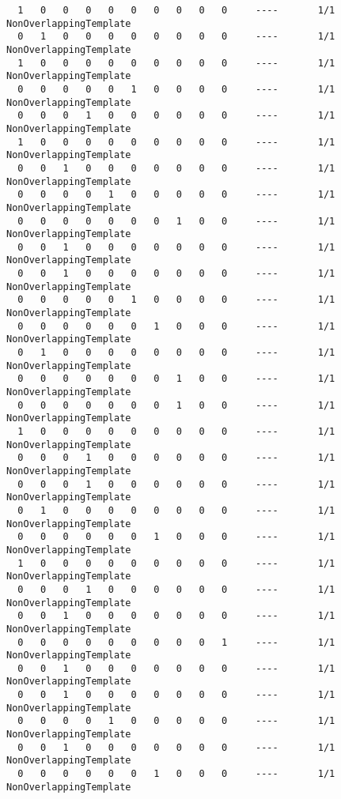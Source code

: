 \begin{code}
\begin{verbatim}
  1   0   0   0   0   0   0   0   0   0     ----       1/1       NonOverlappingTemplate
  0   1   0   0   0   0   0   0   0   0     ----       1/1       NonOverlappingTemplate
  1   0   0   0   0   0   0   0   0   0     ----       1/1       NonOverlappingTemplate
  0   0   0   0   0   1   0   0   0   0     ----       1/1       NonOverlappingTemplate
  0   0   0   1   0   0   0   0   0   0     ----       1/1       NonOverlappingTemplate
  1   0   0   0   0   0   0   0   0   0     ----       1/1       NonOverlappingTemplate
  0   0   1   0   0   0   0   0   0   0     ----       1/1       NonOverlappingTemplate
  0   0   0   0   1   0   0   0   0   0     ----       1/1       NonOverlappingTemplate
  0   0   0   0   0   0   0   1   0   0     ----       1/1       NonOverlappingTemplate
  0   0   1   0   0   0   0   0   0   0     ----       1/1       NonOverlappingTemplate
  0   0   1   0   0   0   0   0   0   0     ----       1/1       NonOverlappingTemplate
  0   0   0   0   0   1   0   0   0   0     ----       1/1       NonOverlappingTemplate
  0   0   0   0   0   0   1   0   0   0     ----       1/1       NonOverlappingTemplate
  0   1   0   0   0   0   0   0   0   0     ----       1/1       NonOverlappingTemplate
  0   0   0   0   0   0   0   1   0   0     ----       1/1       NonOverlappingTemplate
  0   0   0   0   0   0   0   1   0   0     ----       1/1       NonOverlappingTemplate
  1   0   0   0   0   0   0   0   0   0     ----       1/1       NonOverlappingTemplate
  0   0   0   1   0   0   0   0   0   0     ----       1/1       NonOverlappingTemplate
  0   0   0   1   0   0   0   0   0   0     ----       1/1       NonOverlappingTemplate
  0   1   0   0   0   0   0   0   0   0     ----       1/1       NonOverlappingTemplate
  0   0   0   0   0   0   1   0   0   0     ----       1/1       NonOverlappingTemplate
  1   0   0   0   0   0   0   0   0   0     ----       1/1       NonOverlappingTemplate
  0   0   0   1   0   0   0   0   0   0     ----       1/1       NonOverlappingTemplate
  0   0   1   0   0   0   0   0   0   0     ----       1/1       NonOverlappingTemplate
  0   0   0   0   0   0   0   0   0   1     ----       1/1       NonOverlappingTemplate
  0   0   1   0   0   0   0   0   0   0     ----       1/1       NonOverlappingTemplate
  0   0   1   0   0   0   0   0   0   0     ----       1/1       NonOverlappingTemplate
  0   0   0   0   1   0   0   0   0   0     ----       1/1       NonOverlappingTemplate
  0   0   1   0   0   0   0   0   0   0     ----       1/1       NonOverlappingTemplate
  0   0   0   0   0   0   1   0   0   0     ----       1/1       NonOverlappingTemplate

\end{verbatim}
\end{code}
